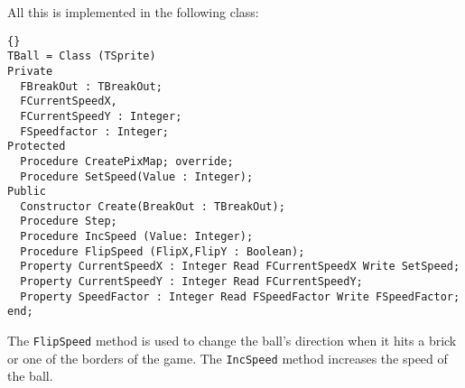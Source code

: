 \documentclass[10pt]{article}
\newcommand{\var}[1]{\texttt{#1}}
\begin{document}
All this is implemented in the following class:
\begin{lstlisting}{}
TBall = Class (TSprite)
Private
  FBreakOut : TBreakOut;
  FCurrentSpeedX,
  FCurrentSpeedY : Integer;
  FSpeedfactor : Integer;
Protected
  Procedure CreatePixMap; override;
  Procedure SetSpeed(Value : Integer);
Public  
  Constructor Create(BreakOut : TBreakOut);
  Procedure Step;
  Procedure IncSpeed (Value: Integer);
  Procedure FlipSpeed (FlipX,FlipY : Boolean);
  Property CurrentSpeedX : Integer Read FCurrentSpeedX Write SetSpeed;
  Property CurrentSpeedY : Integer Read FCurrentSpeedY;
  Property SpeedFactor : Integer Read FSpeedFactor Write FSpeedFactor;
end;
\end{lstlisting}{}
The \var{FlipSpeed} method is used to change the ball's direction when it hits a brick
or one of the borders of the game. The \var{IncSpeed} method increases the speed of the
ball.
\end{document}
